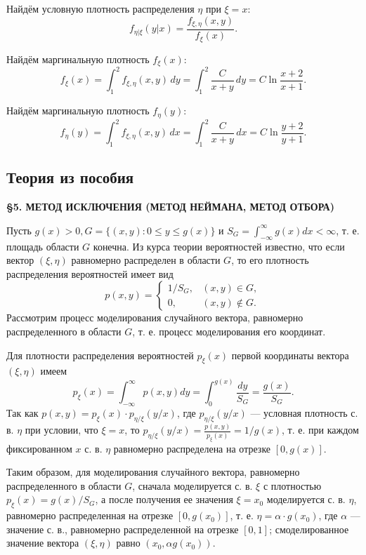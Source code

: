 \documentclass[bachelor, och, pract3]{SCWorks}
\begin{document}
Найдём условную плотность распределения \(\eta\) при \(\xi = x\):
\[
f_{\eta|\xi}(y|x) = \frac{f_{\xi, \eta}(x, y)}{f_\xi(x)}.
\]

Найдём маргинальную плотность \(f_\xi(x)\):
\[
f_\xi(x) = \int_1^2 f_{\xi, \eta}(x, y) \, dy = \int_1^2 \frac{C}{x+y} \, dy = C \ln \frac{x+2}{x+1}.
\]

Найдём маргинальную плотность \(f_\eta(y)\):
\[
f_\eta(y) = \int_1^2 f_{\xi, \eta}(x, y) \, dx = \int_1^2 \frac{C}{x+y} \, dx = C \ln \frac{y+2}{y+1}.
\]

\subsection{Теория из пособия}
\textbf{\S 5. МЕТОД ИСКЛЮЧЕНИЯ (МЕТОД НЕЙМАНА, МЕТОД ОТБОРА)}

Пусть \(g(x) > 0, G = \{(x, y) : 0 \le y \le g(x)\}\) и \(S_G = \int_{-\infty}^{\infty} g(x)dx < \infty\), т. е. площадь области \(G\) конечна. Из курса теории вероятностей известно, что если вектор \((\xi, \eta)\) равномерно распределен в области \(G\), то его плотность распределения вероятностей имеет вид
\[
p(x, y) = \begin{cases} 1/S_G, & (x, y) \in G, \\ 0, & (x, y) \notin G. \end{cases}
\]
Рассмотрим процесс моделирования случайного вектора, равномерно распределенного в области \(G\), т. е. процесс моделирования его координат.

Для плотности распределения вероятностей $p_{\xi}(x)$ первой координаты вектора \((\xi, \eta)\) имеем
\[
p_{\xi}(x) = \int_{-\infty}^{\infty} p(x, y)dy = \int_{0}^{g(x)} \frac{dy}{S_G} = \frac{g(x)}{S_G}.
\]
Так как \(p(x, y) = p_{\xi}(x) \cdot p_{\eta/\xi}(y/x)\), где \(p_{\eta/\xi}(y/x)\) --- условная плотность с. в. \(\eta\) при условии, что \(\xi = x\), то \(p_{\eta/\xi}(y/x) = \frac{p(x, y)}{p_{\xi}(x)} = 1/g(x)\), т. е. при каждом фиксированном \(x\) с. в. \(\eta\) равномерно распределена на отрезке \([0, g(x)]\).

Таким образом, для моделирования случайного вектора, равномерно распределенного в области \(G\), сначала моделируется с. в. \(\xi\) с плотностью \(p_{\xi}(x) = g(x)/S_G\), а после получения ее значения \(\xi = x_0\) моделируется с. в. \(\eta\), равномерно распределенная на отрезке \([0, g(x_0)]\), т. е. \(\eta = \alpha \cdot g(x_0)\), где \(\alpha\) --- значение с. в., равномерно распределенной на отрезке \([0, 1]\); смоделированное значение вектора \((\xi, \eta)\) равно \((x_0, \alpha g(x_0))\).
\end{document}
